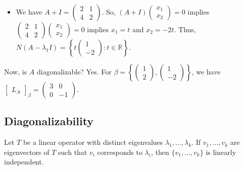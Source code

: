 \documentclass[12pt]{article}
\newenvironment{theorem}[2][Theorem]{\begin{trivlist}
\item[\hskip \labelsep {\bfseries #1}\hskip \labelsep {\bfseries #2.}]}{\end{trivlist}}
\begin{document}
\begin{itemize}
\begin{itemize}
        \item[$\lambda_2$:] We have $A + I = \begin{pmatrix}
        2 & 1 \\ 4 & 2
        \end{pmatrix}$. So, $(A + I)\begin{pmatrix}
        x_1 \\ x_2
        \end{pmatrix} = 0$ implies $\begin{pmatrix}
        2 & 1 \\ 4 & 2
        \end{pmatrix}\begin{pmatrix}
        x_1 \\ x_2
        \end{pmatrix} = 0$ implies $x_1 = t$ and $x_2 = -2t$. Thus, $N(A - \lambda_1 I) = \left\{ t \begin{pmatrix}
        1 \\ -2
        \end{pmatrix} : t \in \mathbb{R} \right\}$. 
    \end{itemize}
\end{itemize}
Now, is $A$ diagonalizable? Yes. For $\beta = \left\{ \begin{pmatrix}
1 \\ 2
\end{pmatrix}, \begin{pmatrix}
1 \\ -2
\end{pmatrix} \right\}$, we have $\begin{bmatrix}
L_A
\end{bmatrix}_\beta = \begin{pmatrix}
3 & 0 \\ 0 & -1
\end{pmatrix}$.

\subsection{Diagonalizability}

\begin{theorem}{5.5}
Let $T$ be a linear operator with distinct eigenvalues $\lambda_1, \dots, \lambda_k$. If $v_1, \dots, v_k$ are eigenvectors of $T$ such that $v_i$ corresponds to $\lambda_i$, then $\{v_1, \dots, v_k\}$ is linearly independent. 
\end{theorem}
\end{document}
